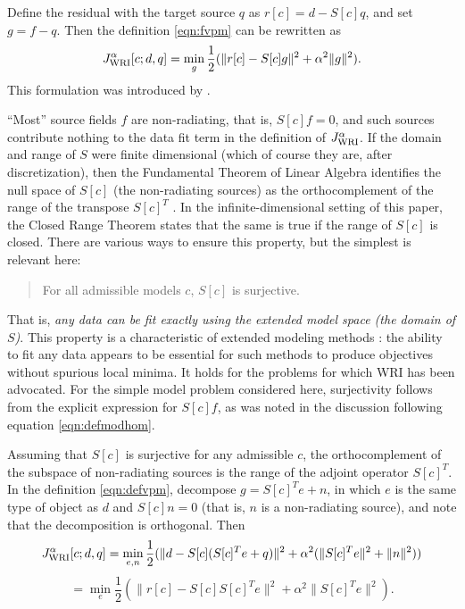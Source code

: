 Define the residual with the
target source $q$ as $r[c]=d-S[c]q$, and set $g=f-q$. Then the
definition \ref{eqn:fvpm} can be rewritten as
\begin{equation}
\label{eqn:defvpm}
  J_{\rm WRI}^{\alpha}[c;d,q] =\min_g \frac{1}{2}(\| r[c]-S[c]g\|^2+\alpha^2\|g\|^2).
\end{equation}
This formulation was introduced by \cite{WangYingst:SEG16}.

``Most'' source fields $f$ are non-radiating, that is, $S[c]f=0$, and
such sources contribute nothing to the data fit term in the definition
of $J_{\rm WRI}^{\alpha}$. If the domain and range of $S$ were finite
dimensional (which of course they are, after discretization), then the
Fundamental Theorem of Linear Algebra identifies the null space of
$S[c]$ (the non-radiating sources) as the orthocomplement of the range
of the transpose $S[c]^T$ \cite[]{Strang:93}. In the
infinite-dimensional setting of this paper, the Closed Range Theorem
\cite[]{Yosida} states that the same is true if the range of $S[c]$ is
closed. There are various ways to ensure this property, but the
simplest is relevant here:
\begin{quote}
  For all admissible models $c$, $S[c]$ is surjective.
\end{quote}
That is, {\em any data can be fit exactly using the extended model
  space (the domain of $S$)}.
This property is a characteristic of extended modeling
methods \cite[]{geoprosp:2008}: the ability to fit any data appears to
be essential for such methods to produce objectives
without spurious local minima. It holds for the problems for which WRI
has been advocated. For the simple model problem considered
here, surjectivity follows from the explicit expression for $S[c]f$,
as was noted in the discussion following equation \ref{eqn:defmodhom}.

Assuming that $S[c]$ is surjective for any admissible $c$, the
orthocomplement of the subspace of non-radiating sources is the range
of the adjoint operator $S[c]^T$. In the
definition \ref{eqn:defvpm}, decompose $g = S[c]^Te + n$, in
which $e$ is the same type of object as $d$ and $S[c]n=0$ (that is,
$n$ is a non-radiating source), and note that the decomposition is
orthogonal. Then
\[
  J_{\rm WRI}^{\alpha}[c;d,q] =
  \min_{e,n} \frac{1}{2}(\| d-S[c](S[c]^Te+q)\|^2+\alpha^2(\|S[c]^Te\|^2+\|n\|^2))
  \]
\begin{equation}
  \label{eqn:defvpmred}
 =  \min_{e} \frac{1}{2}(\|r[c]-S[c]S[c]^Te\|^2+\alpha^2\|S[c]^Te\|^2).
 \end{equation}
 
